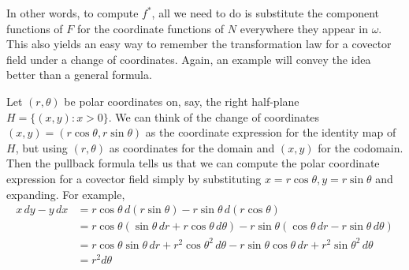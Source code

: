 In other words, to compute $f^*$, all we need to do is substitute the component
functions of $F$ for the coordinate functions of $N$ everywhere they appear in $\omega$. This also yields an easy way to remember the transformation law for a covector field under a change of coordinates. Again, an example will convey the idea better than a general formula.
\begin{example}
Let $(r,\theta)$ be polar coordinates on, say, the right half-plane $H=\{(x,y):x>0\}$. We can think of the change of coordinates $(x,y)=(r\cos\theta,r\sin\theta)$ as the coordinate expression for the identity map of $H$, but using $(r,\theta)$ as coordinates for the domain and $(x,y)$ for the codomain. Then the pullback formula tells us that we can compute the polar coordinate expression for a covector field simply by substituting $x=r\cos\theta,y=r\sin\theta$ and expanding. For example,
\begin{align*}
x\,dy-y\,dx&=r\cos\theta\,d(r\sin\theta)-r\sin\theta\,d(r\cos\theta)\\
&=r\cos\theta(\sin\theta\,dr+r\cos\theta\,d\theta)-r\sin\theta(\cos\theta\,dr-r\sin\theta\,d\theta)\\
&=r\cos\theta\sin\theta\,dr+r^2\cos\theta^2\,d\theta-r\sin\theta\cos\theta\,dr+r^2\sin\theta^2\,d\theta\\
&=r^2d\theta
\end{align*}
\end{example}
